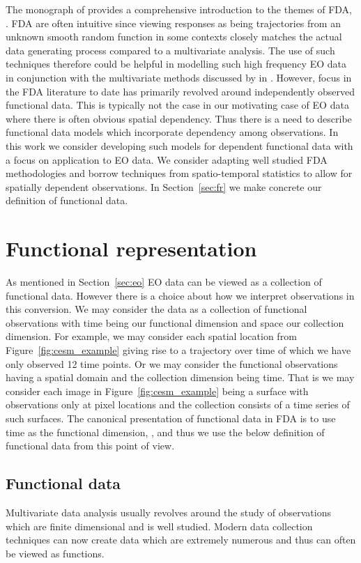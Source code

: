 The monograph of \citeauthor{ramsay_functional_2010} provides a comprehensive introduction to the themes of FDA, \citep{ramsay_functional_2010}.
FDA are often intuitive since viewing responses as being trajectories from an unknown smooth random function in some contexts closely matches the actual data generating process compared to a multivariate analysis.
The use of such techniques therefore could be helpful in modelling such high frequency EO data in conjunction with the multivariate methods discussed by \citeauthor{cressie_statistics_2011} in \citep{cressie_statistics_2011}.
However, focus in the FDA literature to date has primarily revolved around independently observed functional data.
This is typically not the case in our motivating case of EO data where there is often obvious spatial dependency.
Thus there is a need to describe functional data models which incorporate dependency among observations.
In this work we consider developing such models for dependent functional data with a focus on application to EO data.
We consider adapting well studied FDA methodologies and borrow techniques from spatio-temporal statistics to allow for spatially dependent observations.
In Section~\ref{sec:fr} we make concrete our definition of functional data. 

\section{Functional representation \label{sec:fr}}
As mentioned in Section~\ref{sec:eo} EO data can be viewed as a collection of functional data.
However there is a choice about how we interpret observations in this conversion.
We may consider the data as a collection of functional observations with time being our functional dimension and space our collection dimension.
For example, we may consider each spatial location from Figure~\ref{fig:cesm_example} giving rise to a trajectory over time of which we have only observed 12 time points.
Or we may consider the functional observations having a spatial domain and the collection dimension being time.
That is we may consider each image in Figure~\ref{fig:cesm_example} being a surface with observations only at pixel locations and the collection consists of a time series of such surfaces. 
The canonical presentation of functional data in FDA is to use time as the functional dimension, \citep{ramsay_functional_2010}, and thus we use the below definition of functional data from this point of view. 

\subsection{Functional data \label{ssec:fd}}
Multivariate data analysis usually revolves around the study of observations which are finite dimensional and is well studied.
Modern data collection techniques can now create data which are extremely numerous and thus can often be viewed as functions.

